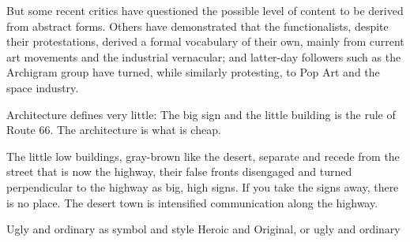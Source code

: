     But some recent critics  have  questioned  the possible level of content to  be derived  from  abstract forms.
    Others have  demonstrated that the functionalists,  despite  their protestations, derived  a  formal vocabulary of their own, mainly from current art movements and the industrial vernacular;
    and  latter-day  followers  such  as  the  Archigram  group  have turned,  while  similarly  protesting,  to Pop  Art and  the space  industry.\cite{Venturi1972}

    Architecture defines very little: The big sign and the little building is the rule of Route 66.
    The architecture is what is cheap.\cite{Venturi1972}



    The little low buildings, gray-brown like the desert, separate and recede from the street that is now the highway, their false fronts disengaged and turned perpendicular to the highway as big, high signs.
    If you take the signs away, there is no place.
    The desert town is intensified communication along the highway.\cite{Venturi1972}

    Ugly and ordinary as symbol and style
    Heroic and Original, or ugly and ordinary


